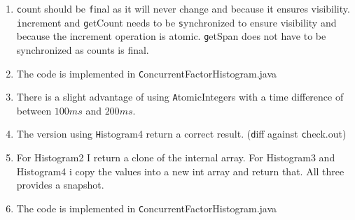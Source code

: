 \documentclass{tufte-handout}
\begin{document}
    \begin{enumerate}
      \item \texttt count should be \texttt final as it will never change and because it ensures visibility. \texttt increment and \texttt getCount needs to be \texttt synchronized to ensure visibility and because the increment operation is atomic. \texttt getSpan does not have to be synchronized as counts is final.
      \item The code is implemented in \texttt ConcurrentFactorHistogram.java
      \item There is a slight advantage of using \texttt AtomicIntegers with a time difference of between $100ms$ and $200ms$.
      \item The version using \texttt Histogram4 return a correct result. (\texttt diff against \texttt check.out)
      \item For Histogram2 I return a clone of the internal array. For Histogram3 and Histogram4 i copy the values into a new int array and return that. All three provides a snapshot.
      \item The code is implemented in \texttt ConcurrentFactorHistogram.java
    \end{enumerate}
\end{document}
